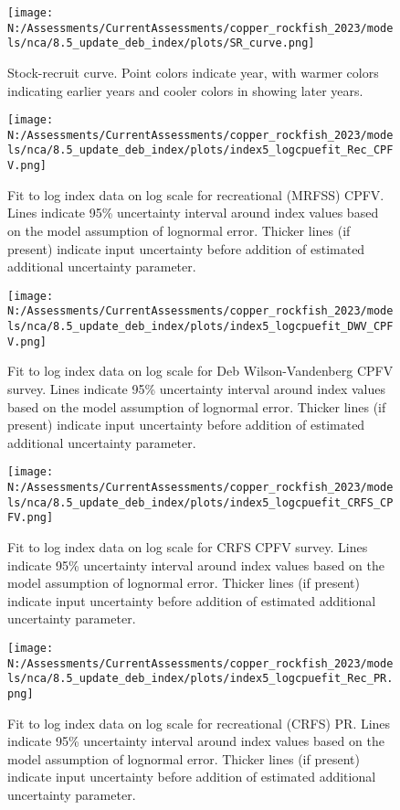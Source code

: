 \documentclass[11pt,
  english,
  letterpaper,
]{article}
\begin{document}
\begin{figure}
\centering
\texttt{[image: N:/Assessments/CurrentAssessments/copper\_rockfish\_2023/models/nca/8.5\_update\_deb\_index/plots/SR\_curve.png]}
\caption{Stock-recruit curve. Point colors indicate year, with warmer colors indicating earlier years and cooler colors in showing later years.\label{fig:bh-curve}}
\end{figure}

\begin{figure}
\centering
\texttt{[image: N:/Assessments/CurrentAssessments/copper\_rockfish\_2023/models/nca/8.5\_update\_deb\_index/plots/index5\_logcpuefit\_Rec\_CPFV.png]}
\caption{Fit to log index data on log scale for recreational (MRFSS) CPFV. Lines indicate 95\% uncertainty interval around index values based on the model assumption of lognormal error. Thicker lines (if present) indicate input uncertainty before addition of estimated additional uncertainty parameter.\label{fig:mrfss-cpfv-index-fit}}
\end{figure}

\begin{figure}
\centering
\texttt{[image: N:/Assessments/CurrentAssessments/copper\_rockfish\_2023/models/nca/8.5\_update\_deb\_index/plots/index5\_logcpuefit\_DWV\_CPFV.png]}
\caption{Fit to log index data on log scale for Deb Wilson-Vandenberg CPFV survey. Lines indicate 95\% uncertainty interval around index values based on the model assumption of lognormal error. Thicker lines (if present) indicate input uncertainty before addition of estimated additional uncertainty parameter.\label{fig:dwv-cpfv-index-fit}}
\end{figure}

\begin{figure}
\centering
\texttt{[image: N:/Assessments/CurrentAssessments/copper\_rockfish\_2023/models/nca/8.5\_update\_deb\_index/plots/index5\_logcpuefit\_CRFS\_CPFV.png]}
\caption{Fit to log index data on log scale for CRFS CPFV survey. Lines indicate 95\% uncertainty interval around index values based on the model assumption of lognormal error. Thicker lines (if present) indicate input uncertainty before addition of estimated additional uncertainty parameter.\label{fig:crfs-cpfv-index-fit}}
\end{figure}

\begin{figure}
\centering
\texttt{[image: N:/Assessments/CurrentAssessments/copper\_rockfish\_2023/models/nca/8.5\_update\_deb\_index/plots/index5\_logcpuefit\_Rec\_PR.png]}
\caption{Fit to log index data on log scale for recreational (CRFS) PR. Lines indicate 95\% uncertainty interval around index values based on the model assumption of lognormal error. Thicker lines (if present) indicate input uncertainty before addition of estimated additional uncertainty parameter.\label{fig:crfs-pr-index-fit}}
\end{figure}
\end{document}
